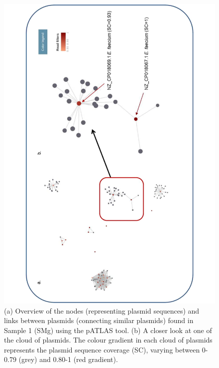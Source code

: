 \begin{figure}[h!]
\centering
\includegraphics[angle=-90,width=\textwidth]{figures/chapter 2/41598_2018_31873_Fig3_HTML.pdf}
\caption{(a) Overview of the nodes (representing plasmid sequences) and links between plasmids (connecting similar plasmids) found in Sample 1 (\ac{SMg}) using the pATLAS tool. (b) A closer look at one of the cloud of plasmids. The colour gradient in each cloud of plasmids represents the plasmid sequence coverage (SC), varying between 0-0.79 (grey) and 0.80-1 (red gradient).}
\label{fig:chap2_figure3}
\end{figure}

